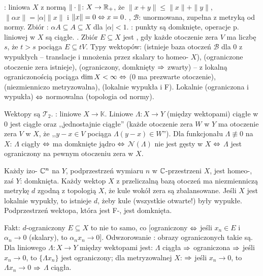 : liniowa $X$  z normą $\|\cdot \|  \colon  X \to \mathbb{R}_+$, że $\|x+y\| \le \|x\|+\|y\|$, $\|\alpha x\| = |\alpha| \|x\|$ i $\|x\| = 0 \Leftrightarrow x = 0$.
, $\mathscr B$: unormowana, zupełna z 
metryką od normy.
Zbiór : $\alpha A \subseteq A \subseteq X$ dla $|\alpha| < 1$.
: punkty są domknięte, operacje p. liniowej w $X$ są ciągłe.
. Zbiór $E \subseteq X$ jest , gdy każde otoczenie zera $V$ ma liczbę $s$, że $t > s$ pociąga $E \subseteq tV$.
Typy wektopów:
 (istnieje baza otoczeń $\mathcal B$ dla $0$ z wypukłych -- translacje i mnożenia przez skalary to homeo- $X$), 
 (ograniczone otoczenie zera istnieje), 
 (ograniczony, domknięty $\Rightarrow$ zwarty) -- z lokalną ograniczonością pociąga $\dim X < \infty \Leftrightarrow$
 ($0$ ma prezwarte otoczenie),
 (niezmienniczo metryzowalna), 
 (lokalnie wypukła i F). 
Lokalnie (ograniczona i wypukła) $\Leftrightarrow$ normowalna (topologia od normy).

Wektopy są $\mathcal T_2$.
:  liniowe $X \to \mathbb K$.
Liniowe $\Lambda \colon X \to Y$ (między wektopami) ciągłe w $0$ jest ciągłe oraz ,,jednostajnie ciągłe'' (każde otoczenie zera $W$ w $Y$ ma otoczenie zera $V$ w $X$, że ,,$y-x \in V$ pociąga $\Lambda (y-x) \in W$'').
Dla funkcjonału $\Lambda \not\equiv 0$ na $X$: $\Lambda$ ciągły $\Leftrightarrow$ ma domknięte jądro $\Leftrightarrow$ $\mathcal N(\Lambda)$ nie jest gęsty w $X$ $\Leftrightarrow$ $\Lambda$ jest ograniczony na pewnym otoczeniu zera w $X$.

Każdy  izo- $\mathbb{C}^n$ na $Y$, podprzestrzeń wymiaru $n$ w $\mathbb{C}$-przestrzeni $X$, jest homeo-, zaś $Y$: domknięta.
Każdy  wektop $X$ z przeliczalną bazą otoczeń ma niezmienniczą metrykę $d$ zgodną z topologią $X$, że kule wokół zera są zbalansowane.
Jeśli $X$ jest lokalnie wypukły, to istnieje $d$, żeby kule (wszystkie otwarte!) były wypukłe.
Podprzestrzeń wektopa, która jest F-, jest domknięta.

Fakt:  $d$-ograniczony $E\subseteq X$ to nie to samo, co [ograniczony $\Leftrightarrow$ jeśli $x_n \in E$ i $\alpha_n \to 0$ (skalary), to $\alpha_n x_n \to 0$].
Odwzorowanie : obrazy ograniczonych takie są.
Dla liniowego $\Lambda \colon X \to Y$ między wektopami jest: $\Lambda$ ciągła $\Rightarrow$ ograniczona $\Rightarrow$ jeśli $x_n \to 0$, to $\{\Lambda x_n\}$ jest ograniczony; dla metryzowalnej $X$: $\Rightarrow$ jeśli $x_n \to 0$, to $\Lambda x_n \to 0$ $\Rightarrow$ $\Lambda$ ciągła.

